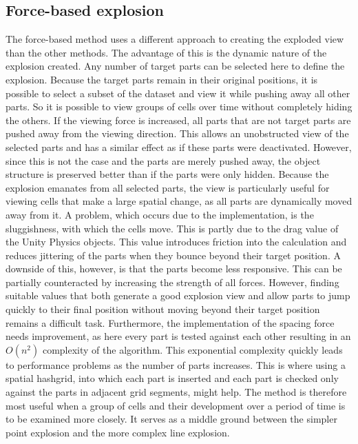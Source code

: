 \subsection{Force-based explosion}
The force-based method uses a different approach to creating the exploded view than the other methods. The advantage of this is the dynamic nature of the explosion created. Any number of target parts can be selected here to define the explosion. Because the target parts remain in their original positions, it is possible to select a subset of the dataset and view it while pushing away all other parts. So it is possible to view groups of cells over time without completely hiding the others. If the viewing force is increased, all parts that are not target parts are pushed away from the viewing direction. This allows an unobstructed view of the selected parts and has a similar effect as if these parts were deactivated. However, since this is not the case and the parts are merely pushed away, the object structure is preserved better than if the parts were only hidden. Because the explosion emanates from all selected parts, the view is particularly useful for viewing cells that make a large spatial change, as all parts are dynamically moved away from it. A problem, which occurs due to the implementation, is the sluggishness, with which the cells move. This is partly due to the drag value of the Unity Physics objects. This value introduces friction into the calculation and reduces jittering of the parts when they bounce beyond their target position. A downside of this, however, is that the parts become less responsive. This can be partially counteracted by increasing the strength of all forces. However, finding suitable values that both generate a good explosion view and allow parts to jump quickly to their final position without moving beyond their target position remains a difficult task. Furthermore, the implementation of the spacing force needs improvement, as here every part is tested against each other resulting in an $O(n^2)$ complexity of the algorithm. This exponential complexity quickly leads to performance problems as the number of parts increases. This is where using a spatial hashgrid, into which each part is inserted and each part is checked only against the parts in adjacent grid segments, might help. The method is therefore most useful when a group of cells and their development over a period of time is to be examined more closely. It serves as a middle ground between the simpler point explosion and the more complex line explosion.

